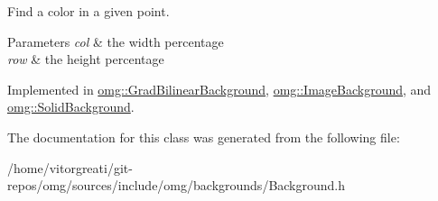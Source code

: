 Find a color in a given point. 


\begin{DoxyParams}{Parameters}
{\em col} & the width percentage \\
\hline
{\em row} & the height percentage \\
\hline
\end{DoxyParams}


Implemented in \mbox{\hyperlink{classomg_1_1_grad_bilinear_background_a074c489f7e8514420bd1e1f362202b03}{omg\+::\+Grad\+Bilinear\+Background}}, \mbox{\hyperlink{classomg_1_1_image_background_af1d870d7ec4868d25f3ec4cf724bb8f6}{omg\+::\+Image\+Background}}, and \mbox{\hyperlink{classomg_1_1_solid_background_ac04abd8101b01efbc8dcb6eca309bcb3}{omg\+::\+Solid\+Background}}.



The documentation for this class was generated from the following file\+:\begin{DoxyCompactItemize}
\item 
/home/vitorgreati/git-\/repos/omg/sources/include/omg/backgrounds/Background.\+h\end{DoxyCompactItemize}
